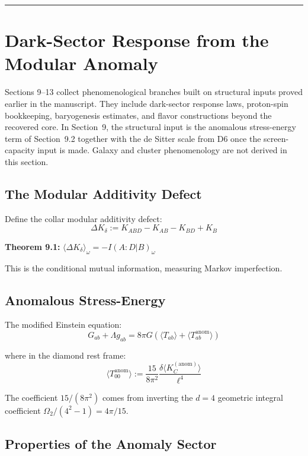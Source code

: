 \begin{center}\rule{0.5\linewidth}{0.5pt}\end{center}

\section{Dark-Sector Response from the Modular Anomaly}\label{9-dark-matter-as-modular-anomaly}

Sections 9--13 collect phenomenological branches built on structural inputs proved earlier in the manuscript. They include dark-sector response laws, proton-spin bookkeeping, baryogenesis estimates, and flavor constructions beyond the recovered core. In Section~9, the structural input is the anomalous stress-energy term of Section~9.2 together with the de Sitter scale from D6 once the screen-capacity input is made. Galaxy and cluster phenomenology are not derived in this section.

\subsection{The Modular Additivity Defect}\label{91-the-modular-additivity-defect}

Define the collar modular additivity defect: \[\Delta K_\delta := K_{ABD} - K_{AB} - K_{BD} + K_B\]

\textbf{Theorem 9.1:} \(\langle \Delta K_\delta \rangle_\omega = -I(A:D|B)_\omega\)

This is the conditional mutual information, measuring Markov imperfection.

\subsection{Anomalous Stress-Energy}\label{92-anomalous-stress-energy}

The modified Einstein equation: \[G_{ab} + \Lambda g_{ab} = 8\pi G \left(\langle T_{ab} \rangle + \langle T_{ab}^{\text{anom}} \rangle\right)\]

where in the diamond rest frame: \[\langle T_{00}^{\text{anom}} \rangle := \frac{15}{8\pi^2} \frac{\delta\langle K_C^{(\text{anom})} \rangle}{\ell^4}\]

The coefficient \(15/(8\pi^2)\) comes from inverting the \(d=4\) geometric integral coefficient \(\Omega_2/(4^2-1) = 4\pi/15\).

\subsection{Properties of the Anomaly Sector}\label{93-properties-of-the-anomaly-sector}

